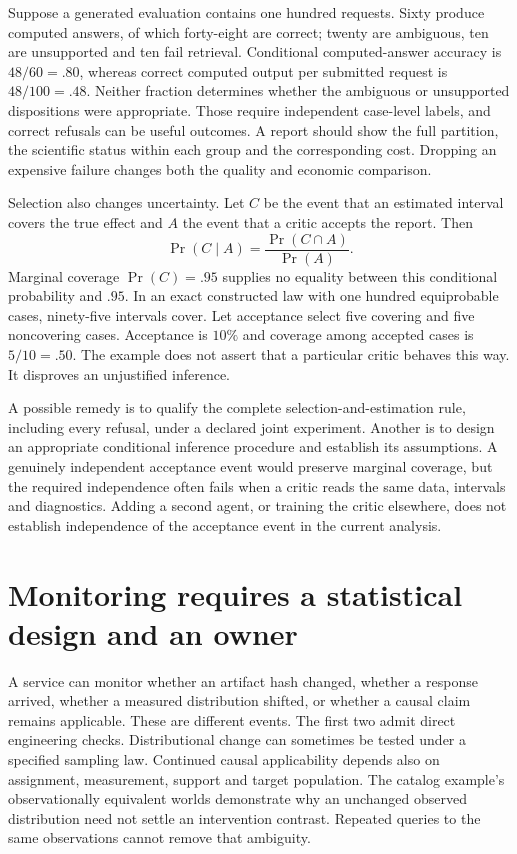 Suppose a generated evaluation contains one hundred requests. Sixty produce
computed answers, of which forty-eight are correct; twenty are ambiguous,
ten are unsupported and ten fail retrieval. Conditional computed-answer
accuracy is \(48/60=.80\), whereas correct computed output per submitted
request is \(48/100=.48\). Neither fraction determines whether the ambiguous
or unsupported dispositions were appropriate. Those require independent
case-level labels, and correct refusals can be useful outcomes. A report
should show the full partition, the scientific status within each group and
the corresponding cost. Dropping an expensive failure changes both the quality
and economic comparison.
\citep{exec16_report_oracle}

Selection also changes uncertainty. Let \(C\) be the event that an estimated
interval covers the true effect and \(A\) the event that a critic accepts the
report. Then
\[
 \Pr(C\mid A)=\frac{\Pr(C\cap A)}{\Pr(A)}.
\]
Marginal coverage \(\Pr(C)=.95\) supplies no equality between this conditional
probability and \(.95\). In an exact constructed law with one hundred
equiprobable cases, ninety-five intervals cover. Let acceptance select five
covering and five noncovering cases. Acceptance is \(10\%\) and coverage among
accepted cases is \(5/10=.50\). The example does not assert that a particular
critic behaves this way. It disproves an unjustified inference.

A possible remedy is to qualify the complete selection-and-estimation rule,
including every refusal, under a declared joint experiment. Another is to
design an appropriate conditional inference procedure and establish its
assumptions. A genuinely independent acceptance event would preserve marginal
coverage, but the required independence often fails when a critic reads the
same data, intervals and diagnostics. Adding a second agent, or training the
critic elsewhere, does not establish independence of the acceptance event in
the current analysis.

\section{Monitoring requires a statistical design and an owner}

A service can monitor whether an artifact hash changed, whether a response
arrived, whether a measured distribution shifted, or whether a causal claim
remains applicable. These are different events. The first two admit direct
engineering checks. Distributional change can sometimes be tested under a
specified sampling law. Continued causal applicability depends also on
assignment, measurement, support and target population. The catalog example's
observationally equivalent worlds demonstrate why an unchanged observed
distribution need not settle an intervention contrast. Repeated queries to the
same observations cannot remove that ambiguity.
\citep{exec16_dh_exact}

